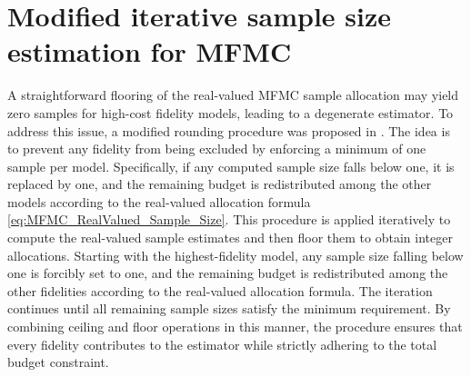 \section{Modified iterative sample size estimation for MFMC}\label{sec:Modified_IntegerValued_Sample_Size}
A straightforward flooring of the real-valued MFMC sample allocation may yield zero samples for high-cost fidelity models, leading to a degenerate estimator. To address this issue, a modified rounding procedure was proposed in \cite{GrGuJuWa:2023}. The idea is to prevent any fidelity from being excluded by enforcing a minimum of one sample per model. Specifically, if any computed sample size falls below one, it is replaced by one, and the remaining budget is redistributed among the other models according to the real-valued allocation formula \eqref{eq:MFMC_RealValued_Sample_Size}. This procedure is applied iteratively to compute the real-valued sample estimates and then floor them to obtain integer allocations. Starting with the highest-fidelity model, any sample size falling below one is forcibly set to one, and the remaining budget is redistributed among the other fidelities according to the real-valued allocation formula. The iteration continues until all remaining sample sizes satisfy the minimum requirement. By combining ceiling and floor operations in this manner, the procedure ensures that every fidelity contributes to the estimator while strictly adhering to the total budget constraint.

